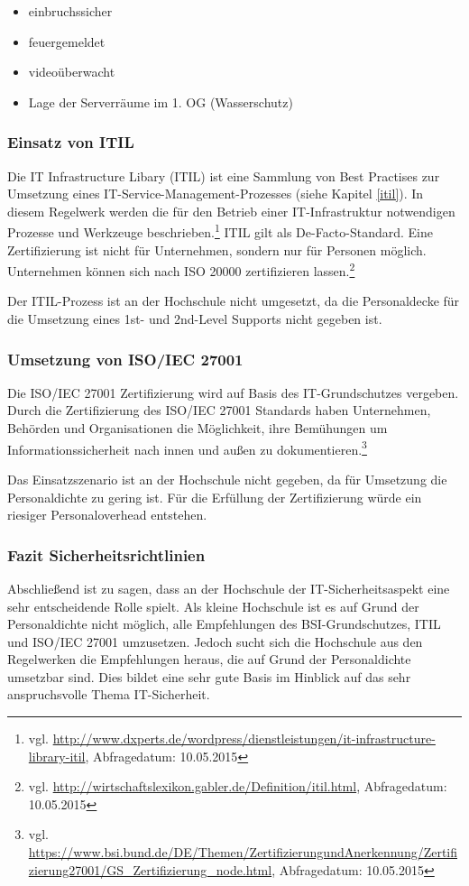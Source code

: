 \begin{itemize}
	\item einbruchssicher
	\item feuergemeldet
	\item videoüberwacht
	\item Lage der Serverräume im 1. OG (Wasserschutz)
\end{itemize}

\subsubsection{Einsatz von ITIL}
Die IT Infrastructure Libary (ITIL) ist eine Sammlung von Best Practises zur Umsetzung eines IT-Service-Management-Prozesses (siehe Kapitel \ref{itil}). In diesem Regelwerk werden die für den Betrieb einer IT-Infrastruktur notwendigen Prozesse und Werkzeuge beschrieben.\footnote{vgl. \url{http://www.dxperts.de/wordpress/dienstleistungen/it-infrastructure-library-itil}, Abfragedatum: 10.05.2015} ITIL gilt als De-Facto-Standard. Eine Zertifizierung ist nicht für Unternehmen, sondern nur für Personen möglich. Unternehmen können sich nach ISO 20000 zertifizieren lassen.\footnote{vgl. \url{http://wirtschaftslexikon.gabler.de/Definition/itil.html}, Abfragedatum: 10.05.2015}

Der ITIL-Prozess ist an der Hochschule nicht umgesetzt, da die Personaldecke für die Umsetzung eines 1st- und 2nd-Level Supports nicht gegeben ist.

\subsubsection{Umsetzung von ISO/IEC 27001}
Die ISO/IEC 27001 Zertifizierung wird auf Basis des IT-Grundschutzes vergeben. Durch die Zertifizierung des ISO/IEC 27001 Standards haben Unternehmen, Behörden und Organisationen die Möglichkeit, ihre Bemühungen um Informationssicherheit nach innen und außen zu dokumentieren.\footnote{vgl. \url{https://www.bsi.bund.de/DE/Themen/ZertifizierungundAnerkennung/Zertifizierung27001/GS_Zertifizierung_node.html}, Abfragedatum: 10.05.2015}

Das Einsatzszenario ist an der Hochschule nicht gegeben, da für Umsetzung die Personaldichte zu gering ist. Für die Erfüllung der Zertifizierung würde ein riesiger Personaloverhead entstehen.

\subsubsection{Fazit Sicherheitsrichtlinien}
Abschließend ist zu sagen, dass an der Hochschule der IT-Sicherheitsaspekt eine sehr entscheidende Rolle spielt. Als kleine Hochschule ist es auf Grund der Personaldichte nicht möglich, alle Empfehlungen des BSI-Grundschutzes, ITIL und ISO/IEC 27001 umzusetzen. Jedoch sucht sich die Hochschule aus den Regelwerken die Empfehlungen heraus, die auf Grund der Personaldichte umsetzbar sind. Dies bildet eine sehr gute Basis im Hinblick auf das sehr anspruchsvolle Thema IT-Sicherheit.

